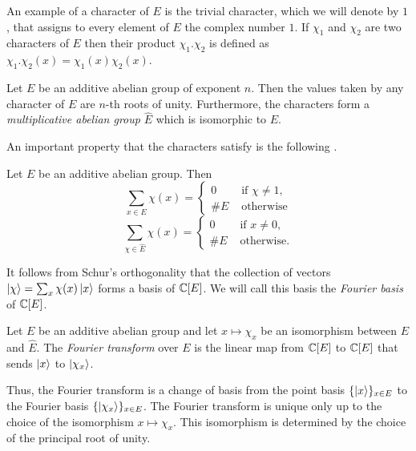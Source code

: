 \documentclass[11pt]{article}
\begin{document}
An example of a character of $E$ is the trivial character, which we
will denote by $1$, that assigns to every element of $E$ the complex
number $1$. If $\chi_1$ and $\chi_2$ are two characters of $E$ then
their product $\chi_1 . \chi_2$ is defined as $\chi_1 . \chi_2(x) =
\chi_1(x) \chi_2(x)$.

\begin{proposition}\cite[Chapter 17, Theorem 1]{Igor}
  Let $E$ be an additive abelian group of exponent $n$. Then the
  values taken by any character of $E$ are $n$-th roots of
  unity. Furthermore, the characters form a \emph{multiplicative
    abelian group} $\hat{E}$ which is isomorphic to $E$.
\end{proposition}

An important property that the characters satisfy is the following
\cite[Corollary 2.14]{Isaacs}.

\begin{proposition}
  Let $E$ be an additive abelian group. Then
  \[ \sum_{x \in E} \chi(x) =%
  \begin{cases}
    0 & \textrm{ if $\chi \neq 1$,}\\
    \# E &\textrm{ otherwise}
  \end{cases}
  \]
  \[
  \sum_{\chi \in \hat{E}} \chi(x) =%
  \begin{cases}
    0 & \textrm{ if $x \neq 0$,}\\
    \# E &\textrm{ otherwise.}
  \end{cases}
  \]
\end{proposition}

It follows {}from Schur's orthogonality that the collection of vectors
$\left| \chi \right\rangle = \sum_x \chi(x) \left| x \right\rangle$ forms a basis of $\mathbb{C}[E]$. We
will call this basis the \emph{Fourier basis} of $\mathbb{C}[E]$.

\begin{definition}
Let $E$ be an additive abelian group and let $x \mapsto \chi_x$ be an
isomorphism between $E$ and $\hat{E}$. The \emph{Fourier transform}
over $E$ is the linear map {}from $\mathbb{C}[E]$ to $\mathbb{C}[E]$ that sends
$\left| x \right\rangle$ to $\left| \chi_x \right\rangle$.
\end{definition}

Thus, the Fourier transform is a change of basis {}from the point basis
$\{ \left| x \right\rangle \}_{x \in E}$ to the Fourier basis $\{
\left| \chi_x \right\rangle\}_{x\in E}$. The Fourier transform is unique only up to
the choice of the isomorphism $x \mapsto \chi_x$. This isomorphism is
determined by the choice of the principal root of unity.
\end{document}

